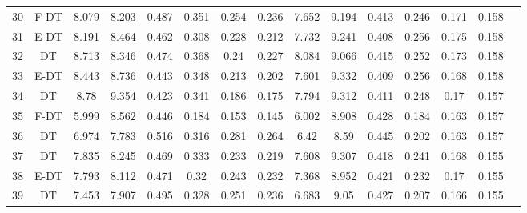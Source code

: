 \begin{longtable}{@{\hskip3pt}c@{\hskip3pt}c@{\hskip3pt}c@{\hskip3pt}c@{\hskip3pt}c@{\hskip3pt}c@{\hskip3pt}c@{\hskip3pt}c@{\hskip3pt}c@{\hskip3pt}c@{\hskip3pt}c@{\hskip3pt}c@{\hskip3pt}c@{\hskip3pt}c@{\hskip3pt}c}
         30 &           F-DT &             8.079 &       8.203 &           0.487 &           0.351 &           0.254 &           0.236 &               7.652 &       9.194 &           0.413 &         0.246 &          0.171 &           0.158 \\
         31 &           E-DT &             8.191 &       8.464 &           0.462 &           0.308 &           0.228 &           0.212 &               7.732 &       9.241 &           0.408 &         0.256 &          0.175 &           0.158 \\
         32 &             DT &             8.713 &       8.346 &           0.474 &           0.368 &            0.24 &           0.227 &               8.084 &       9.066 &           0.415 &         0.252 &          0.173 &           0.158 \\
         33 &           E-DT &             8.443 &       8.736 &           0.443 &           0.348 &           0.213 &           0.202 &               7.601 &       9.332 &           0.409 &         0.256 &          0.168 &           0.158 \\
         34 &             DT &              8.78 &       9.354 &           0.423 &           0.341 &           0.186 &           0.175 &               7.794 &       9.312 &           0.411 &         0.248 &           0.17 &           0.157 \\
         35 &           F-DT &             5.999 &       8.562 &           0.446 &           0.184 &           0.153 &           0.145 &               6.002 &       8.908 &           0.428 &         0.184 &          0.163 &           0.157 \\
         36 &             DT &             6.974 &       7.783 &           0.516 &           0.316 &           0.281 &           0.264 &                6.42 &        8.59 &           0.445 &         0.202 &          0.163 &           0.157 \\
         37 &             DT &             7.835 &       8.245 &           0.469 &           0.333 &           0.233 &           0.219 &               7.608 &       9.307 &           0.418 &         0.241 &          0.168 &           0.155 \\
         38 &           E-DT &             7.793 &       8.112 &           0.471 &            0.32 &           0.243 &           0.232 &               7.368 &       8.952 &           0.421 &         0.232 &           0.17 &           0.155 \\
         39 &             DT &             7.453 &       7.907 &           0.495 &           0.328 &           0.251 &           0.236 &               6.683 &        9.05 &           0.427 &         0.207 &          0.166 &           0.155 \\

\end{longtable}

